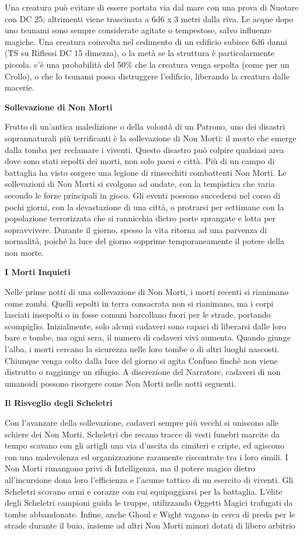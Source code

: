 \documentclass[a4paper,twoside,openany]{book}
\begin{document}
\begin{multicols}{2}
Una creatura può evitare di essere portata via dal mare con una prova di Nuotare con DC 25; altrimenti viene trascinata a 6d6 x 3 metri dalla riva. Le acque dopo uno tsunami sono sempre considerate agitate o tempestose, salvo influenze magiche. Una creatura coinvolta nel cedimento di un edificio subisce 6d6 danni (TS su Riflessi DC 15 dimezza), o la metà se la struttura è particolarmente piccola. c'è una probabilità del 50\% che la creatura venga sepolta (come per un Crollo), o che lo tsunami possa distruggere l'edificio, liberando la creatura dalle macerie.

\textbf{Sollevazione di Non Morti}

Frutto di un'antica maledizione o della volontà di un Patrono, uno dei disastri soprannaturali più terrificanti è la sollevazione di Non Morti: il morto che emerge dalla tomba per reclamare i viventi. Questo disastro può colpire qualsiasi area dove sono stati sepolti dei morti, non solo paesi e città. Più di un campo di battaglia ha visto sorgere una legione di rinsecchiti combattenti Non Morti. Le sollevazioni di Non Morti si svolgono ad ondate, con la tempistica che varia secondo le forze principali in gioco. Gli eventi possono succedersi nel corso di pochi giorni, con la devastazione di una città, o protrarsi per settimane con la popolazione terrorizzata che si rannicchia dietro porte sprangate e lotta per sopravvivere. Durante il giorno, spesso la vita ritorna ad una parvenza di normalità, poiché la luce del giorno sopprime temporaneamente il potere della non morte.

\textbf{I Morti Inquieti}

Nelle prime notti di una sollevazione di Non Morti, i morti recenti si rianimano come zombi. Quelli sepolti in terra consacrata non si rianimano, ma i corpi lasciati insepolti o in fosse comuni barcollano fuori per le strade, portando scompiglio. Inizialmente, solo alcuni cadaveri sono capaci di liberarsi dalle loro bare e tombe, ma ogni sera, il numero di cadaveri vivi aumenta. Quando giunge l'alba, i morti cercano la sicurezza nelle loro tombe o di altri luoghi nascosti. Chiunque venga colto dalla luce del giorno si agita Confuso finché non viene distrutto o raggiunge un rifugio. A discrezione del Narratore, cadaveri di non umanoidi possono risorgere come Non Morti nelle notti seguenti.

\textbf{Il Risveglio degli Scheletri}

Con l'avanzare della sollevazione, cadaveri sempre più vecchi si uniscono alle schiere dei Non Morti. Scheletri che recano tracce di vesti funebri marcite da tempo scavano con gli artigli una via d'uscita da cimiteri e cripte, ed agiscono con una malevolenza ed organizzazione raramente riscontrate tra i loro simili. I Non Morti rimangono privi di Intelligenza, ma il potere magico dietro all'incursione dona loro l'efficienza e l'acume tattico di un esercito di viventi. Gli Scheletri scovano armi e corazze con cui equipaggiarsi per la battaglia. L'élite degli Scheletri campioni guida le truppe, utilizzando Oggetti Magici trafugati da tombe abbandonate. Infine, anche Ghoul e Wight vagano in cerca di preda per le strade durante il buio, insieme ad altri Non Morti minori dotati di libero arbitrio


\end{multicols}
\end{document}
